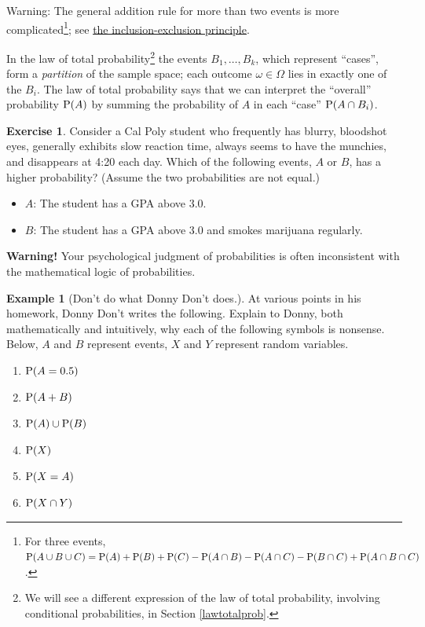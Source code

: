 \documentclass[
]{book}
\providecommand{\tightlist}{%
  \setlength{\itemsep}{0pt}\setlength{\parskip}{0pt}}
\theoremstyle{definition}
\theoremstyle{definition}
\newtheorem{example}{Example}[chapter]
\theoremstyle{definition}
\newtheorem{exercise}{Exercise}[chapter]
\theoremstyle{remark}
\begin{document}
Warning: The general addition rule for more than two events is more complicated\footnote{For three events, \(\textrm{P}(A\cup B\cup C) = \textrm{P}(A) + \textrm{P}(B) + \textrm{P}(C) - \textrm{P}(A\cap B) - \textrm{P}(A \cap C) - \textrm{P}(B \cap C) + \textrm{P}(A \cap B \cap C)\).}; see \href{https://en.wikipedia.org/wiki/Inclusion\%E2\%80\%93exclusion_principle\#In_probability}{the inclusion-exclusion principle}.

In the law of total probability\footnote{We will see a different expression of the law of total probability, involving conditional probabilities, in Section \ref{lawtotalprob}.} the events \(B_1, \ldots, B_k\), which represent ``cases'', form a \emph{partition} of the sample space; each outcome \(\omega\in\Omega\) lies in exactly one of the \(B_i\). The law of total probability says that we can interpret the ``overall'' probability \(\textrm{P}(A)\) by summing the probability of \(A\) in each ``case'' \(\textrm{P}(A\cap B_i)\).

\begin{exercise}
\protect\hypertarget{exr:linda}{}{\label{exr:linda} }Consider a Cal Poly student who frequently has blurry, bloodshot eyes, generally exhibits slow reaction time, always seems to have the munchies, and disappears at 4:20 each day. Which of the following events, \(A\) or \(B\), has a higher probability? (Assume the two probabilities are not equal.)

\begin{itemize}
\tightlist
\item
  \(A\): The student has a GPA above 3.0.
\item
  \(B\): The student has a GPA above 3.0 and smokes marijuana regularly.
\end{itemize}
\end{exercise}

\textbf{Warning!} Your psychological judgment of probabilities is often inconsistent with the mathematical logic of probabilities.

\begin{example}[Don't do what Donny Don't does.]
\protect\hypertarget{exm:dd-notation}{}{\label{exm:dd-notation} {} }
At various points in his homework, Donny Don't writes the following. Explain to Donny, both mathematically and intuitively, why each of the following symbols is nonsense. Below, \(A\) and \(B\) represent events, \(X\) and \(Y\) represent random variables.
\end{example}

\begin{enumerate}
\def\labelenumi{\arabic{enumi}.}
\tightlist
\item
  \(\textrm{P}(A = 0.5)\)
\item
  \(\textrm{P}(A + B)\)
\item
  \(\textrm{P}(A) \cup \textrm{P}(B)\)
\item
  \(\textrm{P}(X)\)
\item
  \(\textrm{P}(X = A)\)
\item
  \(\textrm{P}(X \cap Y)\)
\end{enumerate}
\end{document}
